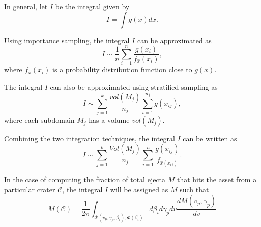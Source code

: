 \documentclass{article}
\begin{document}
In general, let $I$ be the integral given by
\begin{equation}
I = \int g(x)dx.
\end{equation}

Using importance sampling, the integral $I$ can be approximated as
\begin{equation}
I \sim \frac{1}{n}\sum_{i=1}^{n}\frac{g(x_i)}{f_{\hat{x}}(x_i)},
\end{equation}
where $f_{\hat{x}}(x_i)$ is a probability distribution function close to $g(x)$.

The integral $I$ can also be approximated using stratified sampling as
\begin{equation}
I \sim \sum_{j=1}^{k}\frac{vol(M_j)}{n_j}\sum_{i=1}^{n_j}g(x_{ij}),
\end{equation}
where each subdomain $M_j$ has a volume $vol(M_j)$.

Combining the two integration techniques, the integral $I$ can be written as
\begin{equation}
I \sim \sum_{j=1}^{k}\frac{Vol(M_j)}{n_j}\sum_{i=1}^{n}\frac{g(x_{ij})}{f_{\hat{x}(x_{ij})}}.
\end{equation}


In the case of computing the fraction of total ejecta $M$ that hits the asset from a particular crater $\mathcal{C}$, the integral $I$ will be assigned as $M$ such that
\begin{equation}
M(\mathcal{C}) = \frac{1}{2\pi}\int_{\mathcal{R}(v_p,\gamma_p, \beta_i), \Phi(\beta_i)} d\beta_i d\gamma_p dv \frac{dM(v_p,\gamma_p)}{dv}
\end{equation}
\end{document}
